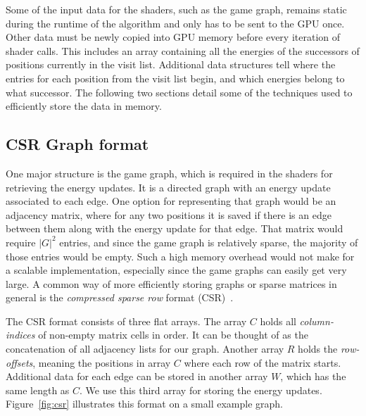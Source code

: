 Some of the input data for the shaders, such as the game graph,
remains static during the runtime of the algorithm
and only has to be sent to the GPU once.
Other data must be newly copied into GPU memory before every iteration of
shader calls.
This includes an array containing all the energies of the successors of
positions currently in the visit list.
Additional data structures tell where the entries for each position from the
visit list begin,
and which energies belong to what successor.
The following two sections detail some of the techniques used to efficiently
store the data in memory.


\subsection{CSR Graph format}

One major structure is the game graph,
which is required in the shaders for retrieving the energy updates.
It is a directed graph with an energy update associated to each edge.
One option for representing that graph would be an adjacency matrix,
where for any two positions it is saved if there is an edge between them
along with the energy update for that edge.
That matrix would require $|G|^2$ entries, and since the game graph is
relatively sparse, the majority of those entries would be empty.
Such a high memory overhead would not make for a scalable implementation,
especially since the game graphs can easily get very large.
A common way of more efficiently storing graphs or sparse matrices in general is
the \emph{compressed sparse row} format (CSR)~\cite{Merrill2015,Hijma2023}.

The CSR format consists of three flat arrays.
The array $C$ holds all \emph{column-indices} of non-empty matrix cells in order.
It can be thought of as the concatenation of all adjacency lists for our graph.
Another array $R$ holds the \emph{row-offsets}, meaning the positions in array
$C$ where each row of the matrix starts.
Additional data for each edge can be stored in another array $W$, which has the
same length as $C$.
We use this third array for storing the energy updates.
Figure~\ref{fig:csr} illustrates this format on a small example graph.

